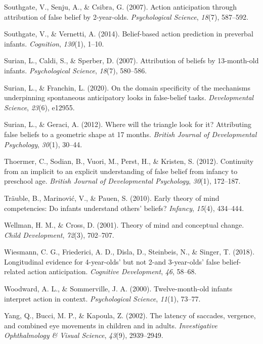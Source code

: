 \documentclass[
  english,
  man,floatsintext]{apa6}
\newlength{\cslhangindent}
\newlength{\cslentryspacingunit} %
\newenvironment{CSLReferences}[2] %
 {%
  \setlength{\parindent}{0pt}
  \ifodd #1
  \let\oldpar\par
  \def\par{\hangindent=\cslhangindent\oldpar}
  \fi
  \setlength{\parskip}{#2\cslentryspacingunit}
 }%
 {}
\begin{document}
\begin{CSLReferences}{1}{0}
\leavevmode{}%
Southgate, V., Senju, A., \& Csibra, G. (2007). Action anticipation through attribution of false belief by 2-year-olds. \emph{Psychological Science}, \emph{18}(7), 587--592.

\leavevmode{}%
Southgate, V., \& Vernetti, A. (2014). Belief-based action prediction in preverbal infants. \emph{Cognition}, \emph{130}(1), 1--10.

\leavevmode{}%
Surian, L., Caldi, S., \& Sperber, D. (2007). Attribution of beliefs by 13-month-old infants. \emph{Psychological Science}, \emph{18}(7), 580--586.

\leavevmode{}%
Surian, L., \& Franchin, L. (2020). On the domain specificity of the mechanisms underpinning spontaneous anticipatory looks in false-belief tasks. \emph{Developmental Science}, \emph{23}(6), e12955.

\leavevmode{}%
Surian, L., \& Geraci, A. (2012). Where will the triangle look for it? Attributing false beliefs to a geometric shape at 17 months. \emph{British Journal of Developmental Psychology}, \emph{30}(1), 30--44.

\leavevmode{}%
Thoermer, C., Sodian, B., Vuori, M., Perst, H., \& Kristen, S. (2012). Continuity from an implicit to an explicit understanding of false belief from infancy to preschool age. \emph{British Journal of Developmental Psychology}, \emph{30}(1), 172--187.

\leavevmode{}%
Träuble, B., Marinović, V., \& Pauen, S. (2010). Early theory of mind competencies: Do infants understand others' beliefs? \emph{Infancy}, \emph{15}(4), 434--444.

\leavevmode{}%
Wellman, H. M., \& Cross, D. (2001). Theory of mind and conceptual change. \emph{Child Development}, \emph{72}(3), 702--707.

\leavevmode{}%
Wiesmann, C. G., Friederici, A. D., Disla, D., Steinbeis, N., \& Singer, T. (2018). Longitudinal evidence for 4-year-olds' but not 2-and 3-year-olds' false belief-related action anticipation. \emph{Cognitive Development}, \emph{46}, 58--68.

\leavevmode{}%
Woodward, A. L., \& Sommerville, J. A. (2000). Twelve-month-old infants interpret action in context. \emph{Psychological Science}, \emph{11}(1), 73--77.

\leavevmode{}%
Yang, Q., Bucci, M. P., \& Kapoula, Z. (2002). The latency of saccades, vergence, and combined eye movements in children and in adults. \emph{Investigative Ophthalmology \& Visual Science}, \emph{43}(9), 2939--2949.

\end{CSLReferences}

\endgroup
\end{document}
